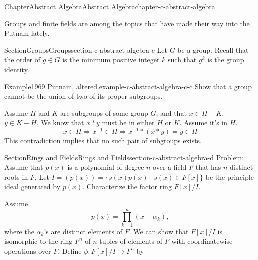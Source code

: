 \documentclass[oneside,10pt,]{book}
\numberwithin{equation}{section}
\begin{document}
\begin{chapterptx}{Chapter}{Abstract Algebra}{}{Abstract Algebra}{}{}{chapter-c-abstract-algebra}
\renewcommand*{\chaptername}{Chapter}
\begin{introduction}{}%
Groups and finite fields are among the topics that have made their way into the Putnam lately.%
\end{introduction}%
%
%
\typeout{************************************************}
\typeout{************************************************}
%
\begin{sectionptx}{Section}{Groups}{}{Groups}{}{}{section-c-abstract-algebra-c}
Let \(G\) be a group. Recall that the order of  \(g \in G\) is the minimum positive integer \(k\) such that \(g^k\) is the group identity.%
\begin{example}{Example}{1969 Putnam, altered.}{example-c-abstract-algebra-c-c}%
Show that a group cannot be the union of two of its proper subgroups.%
\par
Assume \(H\) and \(K\) are subgroups of some group \(G\), and that \(x \in H-K\), \(y \in K-H\).  We know that \(x*y\) must be in either \(H\) or \(K\).  Assume it's in \(H\).%
\begin{equation*}
x \in H \Rightarrow x^{-1} \in H \Rightarrow x^{-1}*(x*y) = y \in H
\end{equation*}
This contradiction implies that no such pair of subgroups exists.%
\end{example}
\end{sectionptx}
%
%
\typeout{************************************************}
\typeout{************************************************}
%
\begin{sectionptx}{Section}{Rings and Fields}{}{Rings and Fields}{}{}{section-c-abstract-algebra-d}
Problem: Assume that \(p(x)\) is a polynomial of degree \(n\) over a field \(F\) that has \(n\) distinct roots in \(F\). Let \(I=(p(x)) = \{s(x)p(x) \mid s(x)\in F[x]\}\) be the principle ideal generated by \(p(x)\).  Characterize the factor ring \(F[x]/I\).%
\par
Assume%
\begin{equation*}
p(x)= \prod_{k=1}^n (x-\alpha_k),
\end{equation*}
where the \(\alpha_k\)'s are distinct elements of \(F\). We can show that \(F[x]/I\) is isomorphic to the ring \(F^n\) of \(n\)-tuples of elements of \(F\) with coordinatewise operations over \(F\).  Define \(\phi:F[x]/I \rightarrow F^n\) by%
\begin{equation*}

\end{equation*}
\end{sectionptx}
\end{chapterptx}
\end{document}
